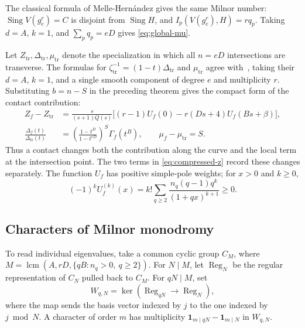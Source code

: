 \documentclass[11pt]{article}
\numberwithin{equation}{section}
\theoremstyle{definition}
\theoremstyle{remark}
\newcommand{\one}{\mathbf 1}
\newcommand{\Reg}{\operatorname{Reg}}
\begin{document}
The classical formula of Melle-Hern\'andez
\cite[\S3.4, Remark~2]{GLM97} gives the same Milnor number:
$\operatorname{Sing}V(g_e^r)=C$ is disjoint from
$\operatorname{Sing}H$, and $I_p(V(g_e^r),H)=rq_p$.
Taking $d=A$, $k=1$, and $\sum_pq_p=eD$ gives
\eqref{eq:global-mu}.

Let $Z_{\mathrm{tr}},\Delta_{\mathrm{tr}},\mu_{\mathrm{tr}}$
denote the specialization in which all $n=eD$ intersections
are transverse. The formulas for
$\zeta_{\mathrm{tr}}^{-1}=(1-t)\Delta_{\mathrm{tr}}$ and
$\mu_{\mathrm{tr}}$ agree with~\cite[\S3.5]{GLM97}, taking
their $d=A$, $k=1$, and a single smooth component of degree
$e$ and multiplicity $r$. Substituting $b=n-S$ in the
preceding theorem gives the compact form of the contact contribution:
\begin{align}
 Z_f-Z_{\mathrm{tr}}
   &=\frac{s}{(s+1)Q(s)}
       \bigl[(r-1)U_f(0)-r(Ds+4)U_f(Bs+\beta)\bigr],
       \label{eq:compressed-z}\\
 \frac{\Delta_f(t)}{\Delta_{\mathrm{tr}}(t)}
   &=\left(\frac{1-t^D}{1-t^{rD}}\right)^S
       \Gamma_f(t^B),\qquad
 \mu_f-\mu_{\mathrm{tr}}=S.\label{eq:compressed-delta}
\end{align}
Thus a contact changes both the contribution along the curve
and the local term at the intersection point. The two terms
in \eqref{eq:compressed-z} record these changes separately.
The function $U_f$ has positive simple-pole weights; for
$x>0$ and $k\ge0$,
\begin{equation}\label{eq:complete-monotonicity}
 (-1)^kU_f^{(k)}(x)
   =k!\sum_{q\ge2}
       \frac{n_q(q-1)q^k}{(1+qx)^{k+1}}\ge0.
\end{equation}

\subsection{Characters of Milnor monodromy}

To read individual eigenvalues, take a common cyclic group
$C_M$, where
$M=\operatorname{lcm}(A,rD,\{qB:n_q>0,\ q\ge2\})$.
For $N\mid M$, let $\Reg_N$ be the regular representation
of $C_N$ pulled back to $C_M$. For $qN\mid M$, set
\[
 W_{q,N}=\ker(\Reg_{qN}\longrightarrow\Reg_N),
\]
where the map sends the basis vector indexed by $j$ to the
one indexed by $j\bmod N$. A character of order $m$ has
multiplicity $\one_{m\mid qN}-\one_{m\mid N}$ in $W_{q,N}$.
\end{document}
